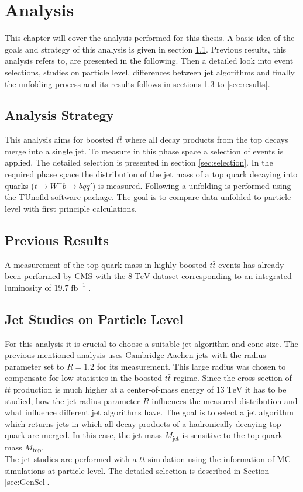 \chapter{Analysis}
	This chapter will cover the analysis performed for this thesis. A basic idea of the goals and strategy of this analysis is given in section \ref{sec:strategy}. Previous results, this analysis refers to, are presented in the following. Then a detailed look into event selections, studies on particle level, differences between jet algorithms and finally the unfolding process and its results follows in sections \ref{sec:jet_studies} to \ref{sec:results}.
\section{Analysis Strategy}
\label{sec:strategy}
	This analysis aims for boosted $t\bar{t}$ where all decay products from the top decays merge into a single jet. To measure in this phase space a selection of events is applied. The detailed selection is presented in section \ref{sec:selection}. In the required phase space the distribution of the jet mass of a top quark decaying into quarks ($t\rightarrow W^{+} b \rightarrow b q \bar{q}'$) is measured. Following a unfolding is performed using the TUnofld \cite{tunfold} software package. The goal is to compare data unfolded to particle level with first principle calculations.
\section{Previous Results}
	A measurement of the top quark mass in highly boosted $t\bar{t}$ events has already been performed by CMS with the $8\;\text{TeV}$ dataset corresponding to an integrated luminosity of $19.7\;\text{fb}^{-1}$ \cite{torben_paper}.
\section{Jet Studies on Particle Level}
\label{sec:jet_studies}
	For this analysis it is crucial to choose a suitable jet algorithm and cone size. The previous mentioned analysis \cite{torben_paper} uses Cambridge-Aachen jets with the radius parameter set to $R=1.2$ for its measurement. This large radius was chosen to compensate for low statistics in the boosted $t\bar{t}$ regime. Since the cross-section of $t\bar{t}$ production is much higher at a center-of-mass energy of $13\;\text{TeV}$ it has to be studied, how the jet radius parameter $R$ influences the measured distribution and what influence different jet algorithms have. The goal is to select a jet algorithm which returns jets in which all decay products of a hadronically decaying top quark are merged. In this case, the jet mass $M_\text{jet}$ is sensitive to the top quark mass $M_\text{top}$.
	\\
	The jet studies are performed with a $t\bar{t}$ simulation using the information of MC simulations at particle level. The detailed selection is described in Section \ref{sec:GenSel}.

